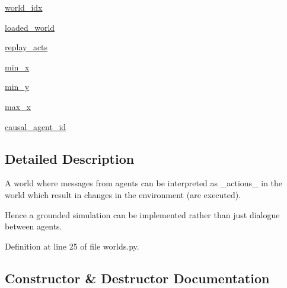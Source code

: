 \begin{DoxyCompactItemize}
\item 
\hyperlink{classparlai_1_1mturk_1_1tasks_1_1talkthewalk_1_1worlds_1_1TalkTheWalkWorld_accdd40d13555e0b8a176d231516787e7}{world\+\_\+idx}
\item 
\hyperlink{classparlai_1_1mturk_1_1tasks_1_1talkthewalk_1_1worlds_1_1TalkTheWalkWorld_a0bc364a0da29e44f84ffeafa0705284c}{loaded\+\_\+world}
\item 
\hyperlink{classparlai_1_1mturk_1_1tasks_1_1talkthewalk_1_1worlds_1_1TalkTheWalkWorld_acf3ae52f81d26805366899e552c602f3}{replay\+\_\+acts}
\item 
\hyperlink{classparlai_1_1mturk_1_1tasks_1_1talkthewalk_1_1worlds_1_1TalkTheWalkWorld_a052a53941b53e0cc5cf2494d8a78d24a}{min\+\_\+x}
\item 
\hyperlink{classparlai_1_1mturk_1_1tasks_1_1talkthewalk_1_1worlds_1_1TalkTheWalkWorld_a62b94a1c38611e9c7db1dfb9dcb1da69}{min\+\_\+y}
\item 
\hyperlink{classparlai_1_1mturk_1_1tasks_1_1talkthewalk_1_1worlds_1_1TalkTheWalkWorld_aec3ffde8ab0a1ba2fd964155667047fa}{max\+\_\+x}
\item 
\hyperlink{classparlai_1_1mturk_1_1tasks_1_1talkthewalk_1_1worlds_1_1TalkTheWalkWorld_ac4bfaadcf06926e60538ea1cbe39136a}{causal\+\_\+agent\+\_\+id}
\end{DoxyCompactItemize}


\subsection{Detailed Description}
\begin{DoxyVerb}A world where messages from agents can be interpreted as _actions_ in the world
which result in changes in the environment (are executed).

Hence a grounded simulation can be implemented rather than just dialogue between
agents.
\end{DoxyVerb}
 

Definition at line 25 of file worlds.\+py.



\subsection{Constructor \& Destructor Documentation}
\mbox{\label{classparlai_1_1mturk_1_1tasks_1_1talkthewalk_1_1worlds_1_1TalkTheWalkWorld_a2bf246c349a56c3dc43e1caff2241c3b}} 

